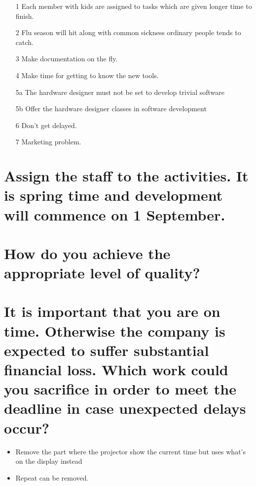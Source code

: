 \documentclass[10pt, a4]{article}
\begin{document}
\begin{itemize}
	\item[1] Each member with kids are assigned to tasks which are given longer time to finish.
	\item[2] Flu season will hit along with common sickness ordinary people tends to catch.
	\item[3] Make documentation on the fly.
	\item[4] Make time for getting to know the new tools.
	\item[5a] The hardware designer must not be set to develop trivial software
	\item[5b] Offer the hardware designer classes in software development
	\item[6] Don't get delayed.
	\item[7] Marketing problem.
\end{itemize}

\section{Assign the staff to the activities. It is spring time and development will commence on 1 September.}



\section{How do you achieve the appropriate level of quality?}



\section{It is important that you are on time. 
	Otherwise the company is expected to suffer substantial financial loss. 
	Which work could you sacrifice in order to meet the deadline in case unexpected delays occur?}

\begin{itemize}
	\item Remove the part where the projector show the current time but uses what's on the display instead
	\item Repeat can be removed.
\end{itemize}
\end{document}
